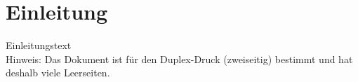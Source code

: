 
\chapter{Einleitung}

Einleitungstext\\
Hinweis: Das Dokument ist für den Duplex-Druck (zweiseitig) bestimmt und hat deshalb viele Leerseiten.